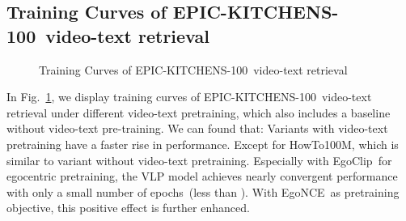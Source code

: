 \documentclass{article}
\newcommand{\dataset}{EgoClip}
\newcommand{\model}{EgoNCE\xspace}
\newcommand{\epic}{EPIC-KITCHENS-100}
\newcommand{\howto}{HowTo100M}
\begin{document}
\subsection{Training Curves of \epic~video-text retrieval}
\begin{figure}[htb]
\centering
\vspace{-0.75cm}
\centering
\vspace{-0.25cm}
\caption{Training Curves of \epic~video-text retrieval}
\label{fig_epic_curve}
\end{figure} In Fig.~\ref{fig_epic_curve}, we display training curves of \epic~video-text retrieval under different video-text pretraining, which also includes a baseline without video-text pre-training.
We can found that:
Variants with video-text pretraining have a faster rise in performance. 
Except for \howto, which is similar to variant without video-text pretraining. Especially with \dataset~for egocentric pretraining, the VLP model achieves nearly convergent performance with only a small number of epochs~(less than ).
With \model~as pretraining objective, this positive effect is further enhanced.
\end{document}
